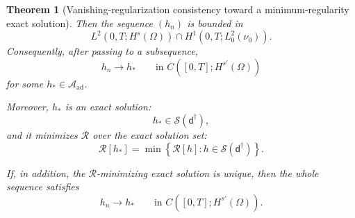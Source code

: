 \documentclass{article}
\newtheorem{theorem}{Theorem}[section]
\theoremstyle{definition}
\newcommand{\obsdata}{\mathsf{d}}
\begin{document}
\begin{theorem}[Vanishing-regularization consistency toward a minimum-regularity exact solution]
    Then the sequence \((h_n)\) is bounded in
    \[
        L^2(0,T;H^s(\Omega))
        \cap
        H^1(0,T;L^2_0(\nu_0)).
    \]
    Consequently, after passing to a subsequence,
    \[
        h_n \to h_\ast
        \qquad\text{in } C([0,T];H^{s'}(\Omega))
    \]
    for some \(h_\ast\in \mathcal A_{\mathrm{ad}}\).

    Moreover, \(h_\ast\) is an exact solution:
    \[
        h_\ast \in \mathcal S(\obsdata^\dagger),
    \]
    and it minimizes \(\mathcal R\) over the exact solution set:
    \[
        \mathcal R[h_\ast]
        =
        \min\left\{
        \mathcal R[h] : h\in \mathcal S(\obsdata^\dagger)
        \right\}.
    \]

    If, in addition, the \(\mathcal R\)-minimizing exact solution is unique, then the whole sequence
    satisfies
    \[
        h_n \to h_\ast
        \qquad\text{in } C([0,T];H^{s'}(\Omega)).
    \]
\end{theorem}
\end{document}
